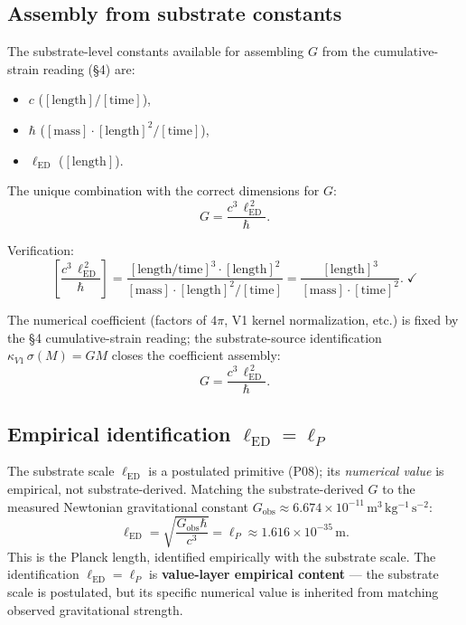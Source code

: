\documentclass[11pt,a4paper]{article}
\begin{document}
\subsection{Assembly from substrate constants}

The substrate-level constants available for assembling $G$ from the cumulative-strain reading (\S4) are:

\begin{itemize}[noitemsep]
\item $c$ ($[\text{length}]/[\text{time}]$),
\item $\hbar$ ($[\text{mass}] \cdot [\text{length}]^2/[\text{time}]$),
\item $\ell_\mathrm{ED}$ ($[\text{length}]$).
\end{itemize}

The unique combination with the correct dimensions for $G$:
\[
G = \frac{c^3\,\ell_\mathrm{ED}^{\,2}}{\hbar}.
\]

Verification:
\[
\left[\frac{c^3\,\ell_\mathrm{ED}^{\,2}}{\hbar}\right] = \frac{[\text{length}/\text{time}]^3 \cdot [\text{length}]^2}{[\text{mass}] \cdot [\text{length}]^2/[\text{time}]} = \frac{[\text{length}]^3}{[\text{mass}] \cdot [\text{time}]^2}. \;\checkmark
\]

The numerical coefficient (factors of $4\pi$, V1 kernel normalization, etc.) is fixed by the \S4 cumulative-strain reading; the substrate-source identification $\kappa_{V1}\,\sigma(M) = GM$ closes the coefficient assembly:
\[
\boxed{G = \frac{c^3\,\ell_\mathrm{ED}^{\,2}}{\hbar}.}
\]

\subsection{Empirical identification $\ell_\mathrm{ED} = \ell_P$}

The substrate scale $\ell_\mathrm{ED}$ is a postulated primitive (P08); its \emph{numerical value} is empirical, not substrate-derived. Matching the substrate-derived $G$ to the measured Newtonian gravitational constant $G_\mathrm{obs} \approx 6.674 \times 10^{-11}\,\mathrm{m^3\,kg^{-1}\,s^{-2}}$:
\[
\ell_\mathrm{ED} = \sqrt{\frac{G_\mathrm{obs}\hbar}{c^3}} = \ell_P \approx 1.616 \times 10^{-35}\,\mathrm{m}.
\]
This is the Planck length, identified empirically with the substrate scale. The identification $\ell_\mathrm{ED} = \ell_P$ is \textbf{value-layer empirical content} --- the substrate scale is postulated, but its specific numerical value is inherited from matching observed gravitational strength.
\end{document}
